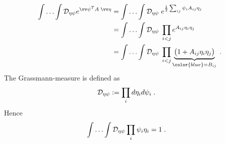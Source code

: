 %
\begin{align}\label{eq:gaussian:A}
\int\ldots\int \Dep e^{\vv\psi^{T} A \;\vv \eta} &=
\int\ldots\int \Dep\; e^{\frac{1}{2} \sum_{ij} \psi_{i} A_{ij} \eta_{j}}\\
&=\int\ldots\int \Dep \;\prod_{i<j} e^{A_{ij} \eta_{i}\eta_{j} }\\
&=\int\ldots\int \Dep \;\prod_{i<j} \underbrace{
\big(1 + A_{ij} \eta_{i}\eta_{j}\big)
}_{\color{blue} = B_{ij}}\;.
\end{align}
%
The Grassmann-measure is defined as
%
\begin{align*}
{\cal D}_{\eta \psi} &:= \prod_{i} d \eta_{i} d\psi_{i}\;.
\end{align*}
%
Hence
%
\begin{align}\label{eq:fundamental:integral}
\int\ldots\int {\cal D}_{\eta \psi} \prod_{i} \psi_{i} \eta_{i}&= 1\;.
\end{align}
%

